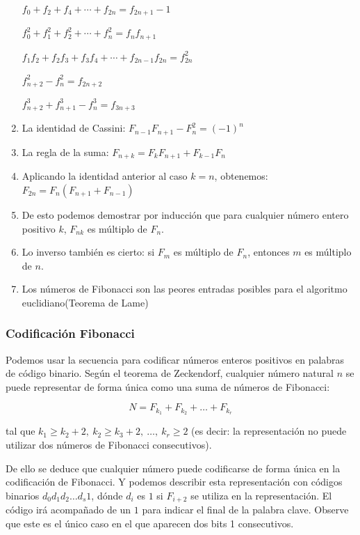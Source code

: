 \begin{enumerate}
	$f_0+f_2+f_4+\cdots+f_{2n}=f_{2n+1}-1$
	
	$f_0^2+f_1^2+f_2^2+\cdots+f_n^2=f_nf_{n+1}$
	
	$f_1f_2+f_2f_3+f_3f_4+\cdots+f_{2n-1}f_{2n}=f_{2n}^2$
	
	
	$f_{n+2}^2-f_n^2=f_{2n+2}$
	
	$f_{n+2}^3+f_{n+1}^3-f_n^3=f_{3n+3}$
	
	\item La identidad de Cassini: $F_{n-1} F_{n+1} - F_n^2 = (-1)^n$
	
	\item La regla de la suma: $F_{n+k} = F_k F_{n+1} + F_{k-1} F_n$
	
	\item Aplicando la identidad anterior al caso $k=n$, obtenemos: $F_{2n} = F_n (F_{n+1} + F_{n-1})$
	
	\item De esto podemos demostrar por inducción que para cualquier número entero positivo $k$, $F_{nk}$ es múltiplo de $F_n$.
	
	\item Lo inverso también es cierto: si $F_m$ es múltiplo de $F_n$, entonces $m$ es múltiplo de $n$.
	
	\item Los números de Fibonacci son las peores entradas posibles para el algoritmo euclidiano(Teorema de Lame)
\end{enumerate}

\subsubsection*{Codificación Fibonacci}

Podemos usar la secuencia para codificar números enteros positivos en palabras de código binario. Según el teorema de Zeckendorf, cualquier número natural $n$ se puede representar de forma única como una suma de números de Fibonacci:

$$N = F_{k_1} + F_{k_2} + \ldots + F_{k_r}$$

tal que $k_1 \ge k_2 + 2,\ k_2 \ge k_3 + 2,\ \ldots,\ k_r \ge 2$ (es decir: la representación no puede utilizar dos números de Fibonacci consecutivos).

De ello se deduce que cualquier número puede codificarse de forma única en la codificación de Fibonacci. Y podemos describir esta representación con códigos binarios $d_0 d_1 d_2 \dots d_s 1$, dónde $d_i$ es $1$ si $F_{i+2}$ se utiliza en la representación. El código irá acompañado de un $1$ para indicar el final de la palabra clave. Observe que este es el único caso en el que aparecen dos bits 1 consecutivos. 

